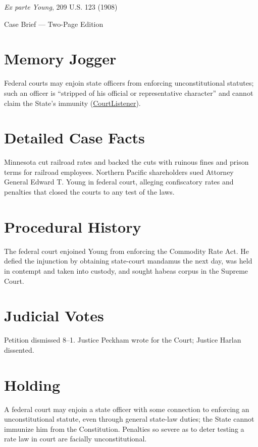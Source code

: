 \documentclass[12pt]{article}
\begin{document}
\begin{center}
{\LARGE \textit{Ex parte Young}, 209 U.S. 123 (1908)\par}
\vspace{0.5em}
{\large Case Brief --- Two-Page Edition\par}
\end{center}

\section{Memory Jogger}
Federal courts may enjoin state officers from enforcing unconstitutional statutes; such an officer is ``stripped of his official or representative character'' and cannot claim the State's immunity (\href{https://www.courtlistener.com/opinion/96819/ex-parte-young/}{CourtListener}).

\section{Detailed Case Facts}
Minnesota cut railroad rates and backed the cuts with ruinous fines and prison terms for railroad employees. Northern Pacific shareholders sued Attorney General Edward T. Young in federal court, alleging confiscatory rates and penalties that closed the courts to any test of the laws.

\section{Procedural History}
The federal court enjoined Young from enforcing the Commodity Rate Act. He defied the injunction by obtaining state-court mandamus the next day, was held in contempt and taken into custody, and sought habeas corpus in the Supreme Court.

\section{Judicial Votes}
Petition dismissed 8--1. Justice Peckham wrote for the Court; Justice Harlan dissented.

\section{Holding}
A federal court may enjoin a state officer with some connection to enforcing an unconstitutional statute, even through general state-law duties; the State cannot immunize him from the Constitution. Penalties so severe as to deter testing a rate law in court are facially unconstitutional.
\end{document}
